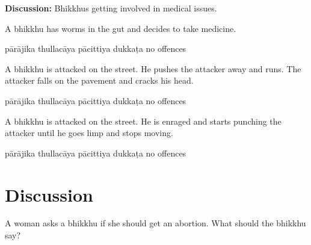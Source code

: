 \begin{exam}{\autoExamName}
\begin{problem*}
\begin{parts}
  \bigskip

  \textbf{Discussion:} Bhikkhus getting involved in medical issues.  

  \bigskip
  
  \item A bhikkhu has worms in the gut and decides to take medicine.

  \bigskip

  \begin{answers}{5}
    \bChoices
     pārājika\eAns
     thullacāya\eAns
     pācittiya\eAns
     dukkaṭa\eAns
     no offences\eAns
    \eChoices
  \end{answers}

  \item A bhikkhu is attacked on the street. He pushes the attacker away and runs. The
  attacker falls on the pavement and cracks his head.

  \bigskip

  \begin{answers}{5}
    \bChoices
     pārājika\eAns
     thullacāya\eAns
     pācittiya\eAns
     dukkaṭa\eAns
     no offences\eAns
    \eChoices
  \end{answers}

  \bigskip

  \item A bhikkhu is attacked on the street. He is enraged and starts punching the attacker
  until he goes limp and stops moving.

  \bigskip

  \begin{answers}{5}
    \bChoices
     pārājika\eAns
     thullacāya\eAns
     pācittiya\eAns
     dukkaṭa\eAns
     no offences\eAns
    \eChoices
  \end{answers}

\end{parts}

\end{problem*}

\end{exam}

\section*{Discussion}

A woman asks a bhikkhu if she should get an abortion. What should the bhikkhu say?

\bigskip

